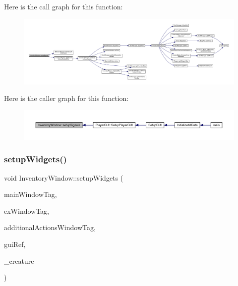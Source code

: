 Here is the call graph for this function\+:
\nopagebreak
\begin{figure}[H]
\begin{center}
\leavevmode
\includegraphics[width=350pt]{d1/dee/class_inventory_window_ada117b35239727b734887c1d56dcf6f0_cgraph}
\end{center}
\end{figure}
Here is the caller graph for this function\+:
\nopagebreak
\begin{figure}[H]
\begin{center}
\leavevmode
\includegraphics[width=350pt]{d1/dee/class_inventory_window_ada117b35239727b734887c1d56dcf6f0_icgraph}
\end{center}
\end{figure}
\mbox{\label{class_inventory_window_a0d286a4370871087af734042a3a6495d}} 
\subsubsection{\texorpdfstring{setup\+Widgets()}{setupWidgets()}}
{\footnotesize\ttfamily void Inventory\+Window\+::setup\+Widgets (\begin{DoxyParamCaption}\item[{const std\+::string \&}]{main\+Window\+Tag,  }\item[{const std\+::string \&}]{ex\+Window\+Tag,  }\item[{const std\+::string \&}]{additional\+Actions\+Window\+Tag,  }\item[{tgui\+::\+Gui \&}]{gui\+Ref,  }\item[{\mbox{\hyperlink{class_base_creature}{Base\+Creature}} $\ast$}]{\+\_\+creature }\end{DoxyParamCaption})}

